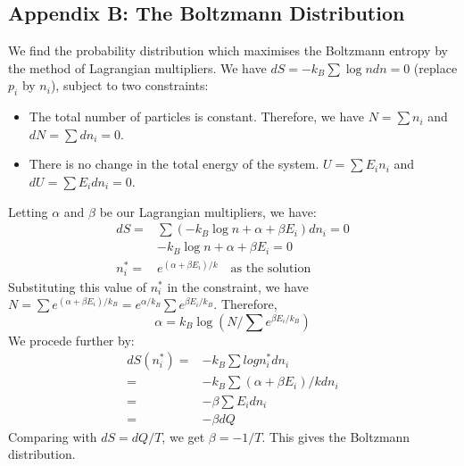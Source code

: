 \documentclass[letterpaper,10pt,english]{article}
\begin{document}
{\subsection*{Appendix B: The Boltzmann Distribution}
We find the probability distribution which maximises the Boltzmann entropy by the method of Lagrangian multipliers. We have $dS=-k_B \sum \log n dn=0$ (replace $p_i$ by $n_i$), subject to two constraints:
\begin{itemize}
\item The total number of particles is constant. Therefore, we have $N=\sum n_i$ and $dN=\sum dn_i=0$.
\item There is no change in the total energy of the system. $U=\sum E_i n_i$ and $dU=\sum E_i dn_i =0$. 
\end{itemize}
Letting $\alpha$ and $\beta$ be our Lagrangian multipliers, we have:
\begin{align*}
dS=&\sum(-k_B \log n +\alpha +\beta E_i)dn_i=0 \\
&-k_B \log n +\alpha +\beta E_i=0 \\
n^{*}_i=&e^{(\alpha+\beta E_i)/k} \quad \text{as the solution}
\end{align*}
Substituting this value of $n_i^{*}$ in the constraint, we have $N=\sum e^{(\alpha+\beta E_i)/k_B}=e^{\alpha/k_B}\sum e^{\beta E_i/k_B}$. Therefore, 
\begin{equation*}
\alpha=k_B \log(N/\sum e^{\beta E_i/k_B})
\end{equation*}
We procede further by: 
\begin{align*}
dS(n_i^{*})=&-k_B \sum log n_i^{*} dn_i \\
=& -k_B \sum (\alpha+\beta E_i)/k dn_i \\
=& -\beta \sum E_i dn_i \\
=& -\beta dQ
\end{align*}
Comparing with $dS=dQ/T$, we get $\beta=-1/T$. This gives the Boltzmann distribution. 
}
\end{document}
